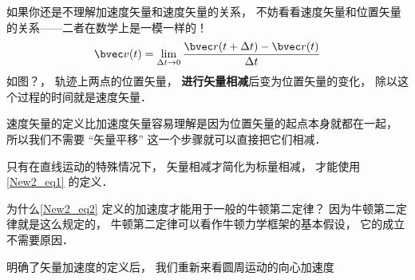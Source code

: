 如果你还是不理解加速度矢量和速度矢量的关系， 不妨看看速度矢量和位置矢量的关系——二者在数学上是一模一样的！
\begin{equation}
\bvec v(t) = \lim_{\Delta t\to 0}\frac{\bvec r(t+\Delta t) - \bvec r(t)}{\Delta t}
\end{equation}
如图？， 轨迹上两点的位置矢量， \textbf{进行矢量相减}后变为位置矢量的变化， 除以这个过程的时间就是速度矢量．

速度矢量的定义比加速度矢量容易理解是因为位置矢量的起点本身就都在一起， 所以我们不需要 “矢量平移” 这一个步骤就可以直接把它们相减．




只有在直线运动的特殊情况下， 矢量相减才简化为标量相减， 才能使用\autoref{New2_eq1} 的定义．




为什么\autoref{New2_eq2} 定义的加速度才能用于一般的牛顿第二定律？ 因为牛顿第二定律就是这么规定的， 牛顿第二定律可以看作牛顿力学框架的基本假设， 它的成立不需要原因．

明确了矢量加速度的定义后， 我们重新来看圆周运动的向心加速度



